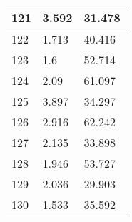 \begin{table}[!ht]
\begin{tabular}{|l|l|l|}
        121 & 3.592 & 31.478 \\ \hline
        122 & 1.713 & 40.416 \\ \hline
        123 & 1.6 & 52.714 \\ \hline
        124 & 2.09 & 61.097 \\ \hline
        125 & 3.897 & 34.297 \\ \hline
        126 & 2.916 & 62.242 \\ \hline
        127 & 2.135 & 33.898 \\ \hline
        128 & 1.946 & 53.727 \\ \hline
        129 & 2.036 & 29.903 \\ \hline
        130 & 1.533 & 35.592 \\ \hline
    \end{tabular}
    \label{table:ModelBase_landmarkresume}
\end{table}

\endinput
